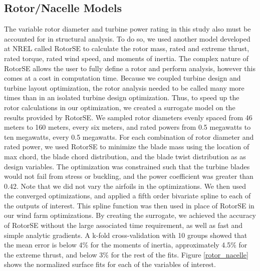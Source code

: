\documentclass[wes, manuscript]{copernicus}
\begin{document}
	\subsection{Rotor/Nacelle Models}
	The variable rotor diameter and turbine power rating in this study also must be accounted for in structural analysis.  To do so, we used another model developed at NREL called RotorSE \citep{ning2013rotorse} to calculate the rotor mass, rated and extreme thrust, rated torque, rated wind speed, and moments of inertia. The complex nature of RotorSE allows the user to fully define a rotor and perform analysis, however this comes at a cost in computation time. Because we coupled turbine design and turbine layout optimization, the rotor analysis needed to be called many more times than in an isolated turbine design optimization. 
Thus, to speed up the rotor calculations in our optimization, we created a surrogate model on the results provided by RotorSE. We sampled rotor diameters evenly spaced from 46 meters to 160 meters, every six meters, and rated powers from 0.5 megawatts to ten megawatts, every 0.5 megawatts. For each combination of rotor diameter and rated power, we used RotorSE to minimize the blade mass using the location of max chord, the blade chord distribution, and the blade twist distribution as as design variables. The optimization was constrained such that the turbine blades would not fail from stress or buckling, and the power coefficient was greater than 0.42. Note that we did not vary the airfoils in the optimizations. We then used the converged optimizations, and applied a fifth order bivariate spline to each of the outputs of interest. This spline function was then used in place of RotorSE in our wind farm optimizations. By creating the surrogate, we achieved the accuracy of RotorSE without the large associated time requirement, as well as fast and simple analytic gradients. 
A k-fold cross-validation with 10 groups showed that the mean error is below 4\% for the moments of inertia, approximately 4.5\% for the extreme thrust, and below 3\% for the rest of the fits. 
Figure \ref{rotor_nacelle} shows the normalized surface fits for each of the variables of interest.
\end{document}
